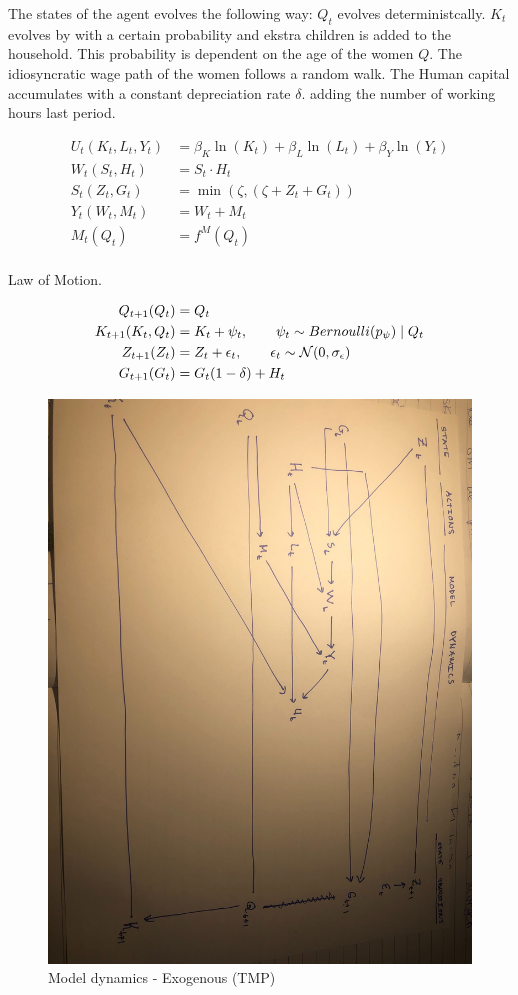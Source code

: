 The states of the agent evolves the following way: $Q_t$ evolves deterministcally. $K_t$ evolves by with a certain probability and ekstra children is added to the household. This probability is dependent on the age of the women $Q$. The idiosyncratic wage path of the women follows a random walk. The Human capital accumulates with a constant depreciation rate $\delta$. adding the number of working hours last period.

\begin{align}
    U_t(K_t, L_t, Y_t) &= \beta_K \ln(K_t) + \beta_L \ln(L_t) + \beta_Y \ln(Y_t) \\
    W_t(S_t, H_t) &=S_t \cdot H_t \\
    S_t(Z_t, G_t) &= \min(\zeta, (\zeta + Z_t + G_t))  \\
    Y_t(W_t, M_t) &= W_t + M_t\\
    M_t(Q_t) &= f^M(Q_t) \\
\end{align}


Law of Motion.

\begin{align}
    Q_{t+1}(Q_t) &= Q_t \\
    K_{t+1}(K_t, Q_t)  &= K_{t} + \psi_t, \qquad \psi_t \sim Bernoulli(p_\psi) \mid Q_t \\
    Z_{t+1}(Z_t) &= Z_t + \epsilon_t, \qquad \epsilon_t \sim \mathcal{N}(0, \sigma_\epsilon) \\
    G_{t+1}(G_t) &= G_t(1 - \delta) + H_t \\
\end{align}


\begin{figure}
    \centering
    \includegraphics[scale=0.1, angle=90]{figures/modeldynamic_tmp_exogenous.jpg}
    \caption{Model dynamics - Exogenous (TMP)}
    \label{fig:tmp_modeldynamics_exogenous}
\end{figure}